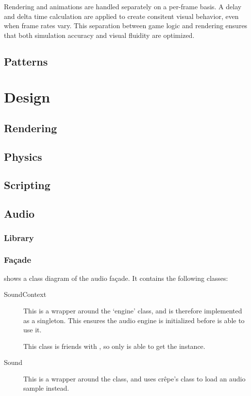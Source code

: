 \documentclass{projdoc}
\begin{document}
Rendering and animations are handled separately on a per-frame basis.
A delay and delta time calculation are applied to create consitent visual behavior, even when frame rates vary.
This separation between game logic and rendering ensures that both simulation accuracy and visual fluidity are optimized.

\subsection{Patterns}

\section{Design}

\subsection{Rendering}

\subsection{Physics}

\subsection{Scripting}

\subsection{Audio}

\subsubsection{Library}

\subsubsection{Fa\c{c}ade}

 shows a class diagram of the audio fa\c{c}ade. It
contains the following classes:
\begin{description}
	\item[SoundContext] This is a wrapper around the 
		`engine' class, and is therefore implemented as a singleton. This ensures the
		audio engine is initialized before  is able to use it.

		This class is friends with , so only  is able
		to get the  instance.
	\item[Sound] This is a wrapper around the  class, and uses
		cr\^epe's  class to load an audio sample instead.
\end{description}
\end{document}
